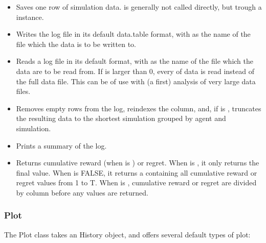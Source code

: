 \documentclass[nojss]{jss}\usepackage[]{graphicx}\usepackage[]{color}
\begin{document}
\begin{itemize}
 \item{}{
    Saves one row of simulation data.  is generally not called directly, but trough a  instance.
 }
 \item{}{
    Writes the  log file in its default data.table format,
    with  as the name of the file which the data is to be written to.
 }
 \item{}{
    Reads a  log file in its default  format,
    with  as the name of the file which the data are to be read from.
    If  is larger than 0, every  of data is read instead of the
    full data file. This can be of use with (a first) analysis of very large data files.
 }
 \item{}{
    Removes empty rows from the  log, reindexes the  column, and,
    if  is , truncates the resulting data to the shortest simulation
    grouped by agent and simulation.
 }
 \item{}{
    Prints a summary of the  log.
 }
 \item{}{
    Returns cumulative reward (when  is ) or regret. When  is ,
    it only returns the final value. When  is FALSE, it returns a  containing all
    cumulative reward or regret values from 1 to T.
    When  is , cumulative reward or regret are divided by column  before any values
    are returned.
 }
\end{itemize}

\subsubsection{Plot}

The Plot class takes an History object, and offers several default types of plot:
\end{document}
